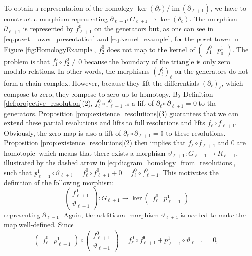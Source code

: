 \documentclass[english,a4paper,nolineno,cleveref]{socg-lipics-v2021}
\DeclareMathOperator{\im}{im}
\begin{document}
To obtain a representation of the homology $\ker(\partial_\ell)/\im(\partial_{\ell+1})$, we have to construct a morphism representing $\partial_{\ell+1}\colon C_{\ell+1}\rightarrow \ker(\partial_\ell)$. The morphism $\partial_{\ell+1}$ is represented by $f_{\ell+1}^0$ on the generators but, as one can see in \eqref{eq:poset_tower_presentation} and \eqref{eq:kernel_example}, for the poset tower in Figure \ref{fig:HomologyExample}, $f_2^0$ does not map to the kernel of $\begin{pmatrix}f_1^0 & p_0^1\end{pmatrix}$. The problem is that $f_1^0\circ f_2^0\neq 0$ because the boundary of the triangle is only zero modulo relations. In other words, the morphisms $(f_\ell^0)_\ell$ on the generators do not form a chain complex. However, because they lift the differentials $(\partial_\ell)_\ell$, which compose to zero, they compose to zero up to homotopy. By Definition \ref{def:projective_resolution}(2), $f^0_{\ell}\circ f^0_{\ell+1}$ is a lift of $\partial_{\ell}\circ \partial_{\ell+1}=0$ to the generators. Proposition \ref{prop:existence_resolutions}(3) guarantees that we can extend these partial resolutions and lifts to full resolutions and lifts $f_\ell\circ f_{\ell+1}$. Obviously, the zero map is also a lift of $\partial_{\ell}\circ \partial_{\ell+1}=0$ to these resolutions. Proposition \ref{prop:existence_resolutions}(2) then implies that $f_\ell\circ f_{\ell+1}$ and $0$ are homotopic, which means that there exists a morphism $\vartheta_{\ell+1}\colon G_{\ell+1}\rightarrow R_{\ell\minus 1}$, illustrated by the dashed arrow in \eqref{eq:diagram_homology_from_resolutions}, such that $p_{\ell\minus 1}^1\circ \vartheta_{\ell+1}=f_\ell^0\circ f_{\ell+1}^0+0=f_\ell^0\circ f_{\ell+1}^0$. This motivates the definition of the following morphism:
\begin{equation}\label{eq:image_morphism}
\begin{pmatrix}f_{\ell+1}^0\\ \vartheta_{\ell+1}\end{pmatrix}\colon G_{\ell+1}\rightarrow \ker\begin{pmatrix}f_\ell^0 & p_{\ell\minus 1}^1\end{pmatrix}
\end{equation}
representing $\partial_{\ell+1}$. Again, the additional morphism $\vartheta_{\ell+1}$ is needed to make the map well-defined. Since 
\begin{equation*}
\begin{pmatrix}f_\ell^0 & p_{\ell\minus 1}^1\end{pmatrix}\circ\begin{pmatrix}f_{\ell+1}^0 \\ \vartheta_{\ell+1}\end{pmatrix}=f_\ell^0\circ f_{\ell+1}^0+p_{\ell\minus 1}^1\circ \vartheta_{\ell+1}=0 ,
\end{equation*}
\end{document}
